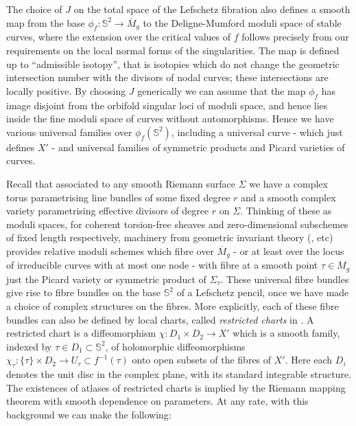 \documentclass[10pt]{article}
\newcommand{\sss}{\mathbb{S}}
\newcommand{\mgbar}{\overline{M}_g}
\begin{document}
The choice of $J$ on the total space of the Lefschetz fibration also defines
a smooth map from the base $\phi_f: \sss^2 \rightarrow \mgbar$ to the
Deligne-Mumford moduli space of stable curves, where the extension
over the critical values of $f$ follows precisely from our
requirements on the local normal forms of the singularities.  The map
is defined up to ``admissible isotopy'', that is isotopies which do
not change the geometric intersection number with the divisors of
nodal curves;  these intersections are locally positive.  By choosing
$J$ generically we can assume that the map $\phi_f$ has image disjoint
from the orbifold singular loci of moduli space, and hence lies inside
the fine moduli space of curves without automorphisms.  Hence we have
various universal families over $\phi_f(\sss^2)$, including a
universal curve - which just defines $X'$ - and universal families of
symmetric products and Picard varieties of curves.

\vspace{0.2cm}

\noindent Recall that associated to any smooth Riemann surface
$\Sigma$ we have a
complex torus parametrising line bundles of some fixed degree $r$ and
a smooth complex variety parametrising effective divisors of degree
$r$ on $\Sigma$.  Thinking of these as moduli spaces, for coherent
torsion-free sheaves and zero-dimensional subschemes of fixed length
respectively, machinery from geometric invariant theory
(\cite{moduliofshaves}, \cite{Altman-Kleiman} etc) provides  
relative moduli schemes which fibre over $\mgbar$ - or at least
  over the locus of irreducible curves with at most one node - with fibre
at a smooth point $\tau \in M_g$ just the Picard variety or symmetric
product of $\Sigma_{\tau}$.  These universal fibre bundles give rise
to fibre bundles on the base $\sss^2$ of a Lefschetz pencil, once we
have made a choice of complex structures on the fibres.  More
explicitly, each of these fibre bundles can also be defined by
local charts, called \emph{restricted charts} in \cite{SKDIS}.  A
restricted chart is a diffeomorphism $\chi: D_1 \times D_2 \rightarrow X'$
which is a smooth family, indexed by $\tau \in D_1 \subset \sss^2$, of
holomorphic diffeomorphisms $\chi_{\tau}: \{ \tau \} \times D_2 \rightarrow
U_{\tau} \subset f^{-1} (\tau)$ onto open subsets of the
fibres of $X'$.  Here each $D_i$ denotes the unit disc in the complex
plane, with its standard integrable structure.  The existences of
atlases of restricted charts is implied by the Riemann mapping
theorem with smooth dependence on parameters.  At any rate, with this
background we can make the following: 
\end{document}
